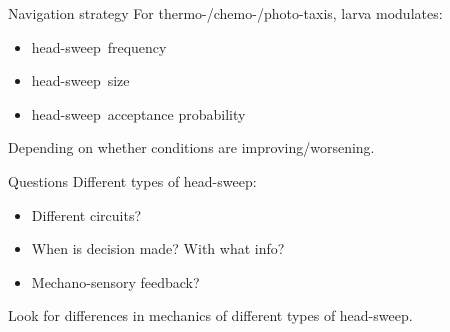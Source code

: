 \documentclass{beamer}%
\newcommand{\hs}{head-sweep}
\begin{document}

\begin{frame}{Navigation strategy}
%
 For thermo-/chemo-/photo-taxis, larva modulates:
 \begin{itemize}
   \item \hs\ frequency 
   \item \hs\ size  
   \item \hs\ acceptance probability 
 \end{itemize}
 Depending on whether conditions are improving/worsening.

%
\end{frame}


\begin{frame}{Questions}
%
 Different types of \hs:
 \begin{itemize}
    \item Different circuits?
    \item When is decision made? With what info?
    \item Mechano-sensory feedback?
  \end{itemize}

  \vp Look for differences in mechanics of different types of \hs.
%
\end{frame}

\end{document}
